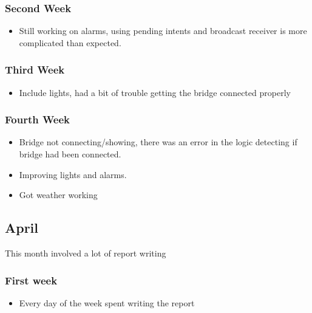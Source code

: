 \subsubsection{Second Week}\label{second-week-5}

\begin{itemize}
\tightlist
\item
  Still working on alarms, using pending intents and broadcast receiver
  is more complicated than expected.
\end{itemize}

\subsubsection{Third Week}\label{third-week-4}

\begin{itemize}
\tightlist
\item
  Include lights, had a bit of trouble getting the bridge connected
  properly
\end{itemize}

\subsubsection{Fourth Week}\label{fourth-week-4}

\begin{itemize}
\tightlist
\item
  Bridge not connecting/showing, there was an error in the logic
  detecting if bridge had been connected.
\item
  Improving lights and alarms.
\item
  Got weather working
\end{itemize}

\subsection{April}\label{april}

This month involved a lot of report writing

\subsubsection{First week}\label{first-week-6}

\begin{itemize}
\tightlist
\item
  Every day of the week spent writing the report
\end{itemize}

